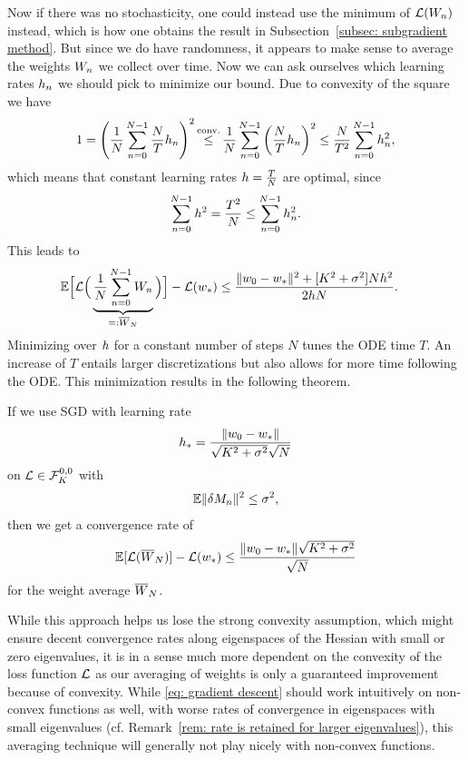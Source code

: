 Now if there was no stochasticity, one could instead use the minimum of
\(\Loss(\Weights_n)\) instead, which is how one obtains the result in
Subsection~\ref{subsec: subgradient method}. But since we do have randomness,
it appears to make sense to average the weights \(\Weights_n\) we collect over
time.
Now we can ask ourselves which learning rates \(\lr_n\) we should pick to
minimize our bound. Due to convexity of the square we have
\begin{align*}
	1 = \left(\frac{1}{N}\sum_{n=0}^{N-1}\frac{N}{T}\lr_n\right)^2
	\xle{\text{conv.}} \frac{1}{N}\sum_{n=0}^{N-1}\left(\frac{N}{T}\lr_n\right)^2
	\le \frac{N}{T^2}\sum_{n=0}^{N-1}\lr_n^2,
\end{align*}
which means that constant learning rates \(\lr=\tfrac{T}N\) are optimal, since
\begin{align*}
	\sum_{n=0}^{N-1}\lr^2 = \frac{T^2}{N} \le \sum_{n=0}^{N-1}\lr_n^2.
\end{align*}
This leads to
\begin{align*}
	\E\Big[
		\Loss\Big(\underbrace{
			\frac{1}{N}\sum_{n=0}^{N-1}\Weights_n
		}_{=:\overline{\Weights}_N}\Big)
	\Big]-\Loss(\minimum)
	&\le \frac{
		\|\weights_0 - \minimum\|^2 + [\lipConst^2+\stdBound^2]N\lr^2
	}{2\lr N}.
\end{align*}
Minimizing over \(\lr\) for a constant number of steps \(N\) tunes the
ODE time \(T\). An increase of \(T\) entails larger discretizations but also
allows for more time following the ODE.
This minimization results in the following theorem.
\begin{theorem}\label{thm: optimal averaging rates}
	If we use SGD with learning rate
	\begin{align*}
		\lr_* = \frac{\|\weights_0-\minimum\|}{\sqrt{\lipConst^2+\stdBound^2}\sqrt{N}}
	\end{align*}
	on \(\Loss\in\lipGradientSet[0,0]{\lipConst}\) with
	\begin{align*}
		\E\|\martIncr_n\|^2 \le \stdBound^2,
	\end{align*}
	then we get a convergence rate of
	\begin{align*}
		\E[\Loss(\overline{\Weights}_N)] -\Loss(\minimum)
		\le \frac{\|\weights_0-\minimum\|\sqrt{\lipConst^2+\stdBound^2}}{\sqrt{N}}
	\end{align*}
	for the weight average \(\overline{\Weights}_N\).
\end{theorem}

While this approach helps us lose the strong convexity assumption, which might
ensure decent convergence rates along eigenspaces of the Hessian with
small or zero eigenvalues, it is in a sense much more dependent on the convexity
of the loss function \(\Loss\) as our averaging of weights is only a
guaranteed improvement because of convexity. While \ref{eq: gradient descent} should work
intuitively on non-convex functions as well, with worse rates of convergence in
eigenspaces with small eigenvalues (cf. Remark~\ref{rem: rate is retained for
larger eigenvalues}), this averaging technique will generally not play nicely
with non-convex functions.


